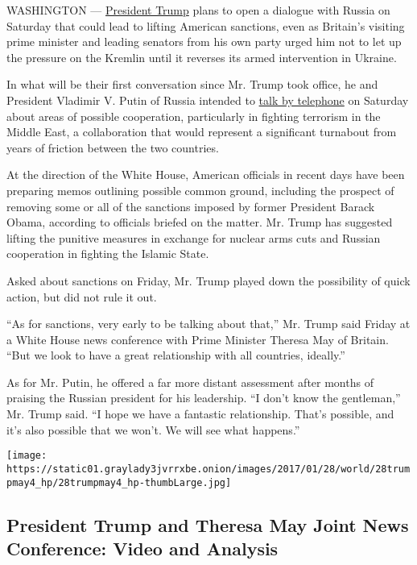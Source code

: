 WASHINGTON ---
\href{https://www.nytimes3xbfgragh.onion/topic/person/donald-trump}{President
Trump} plans to open a dialogue with Russia on Saturday that could lead
to lifting American sanctions, even as Britain's visiting prime minister
and leading senators from his own party urged him not to let up the
pressure on the Kremlin until it reverses its armed intervention in
Ukraine.

In what will be their first conversation since Mr. Trump took office, he
and President Vladimir V. Putin of Russia intended to
\href{http://www.nytimes3xbfgragh.onion/aponline/2017/01/27/world/europe/ap-eu-russia-us.html}{talk
by telephone} on Saturday about areas of possible cooperation,
particularly in fighting terrorism in the Middle East, a collaboration
that would represent a significant turnabout from years of friction
between the two countries.

At the direction of the White House, American officials in recent days
have been preparing memos outlining possible common ground, including
the prospect of removing some or all of the sanctions imposed by former
President Barack Obama, according to officials briefed on the matter.
Mr. Trump has suggested lifting the punitive measures in exchange for
nuclear arms cuts and Russian cooperation in fighting the Islamic State.

Asked about sanctions on Friday, Mr. Trump played down the possibility
of quick action, but did not rule it out.

``As for sanctions, very early to be talking about that,'' Mr. Trump
said Friday at a White House news conference with Prime Minister Theresa
May of Britain. ``But we look to have a great relationship with all
countries, ideally.''

As for Mr. Putin, he offered a far more distant assessment after months
of praising the Russian president for his leadership. ``I don't know the
gentleman,'' Mr. Trump said. ``I hope we have a fantastic relationship.
That's possible, and it's also possible that we won't. We will see what
happens.''

\href{https://www.nytimes3xbfgragh.onion/interactive/2017/01/27/us/politics/donald-trump-theresa-may-live.html}{}

\texttt{[image: https://static01.graylady3jvrrxbe.onion/images/2017/01/28/world/28trumpmay4\_hp/28trumpmay4\_hp-thumbLarge.jpg]}

\hypertarget{president-trump-and-theresa-may-joint-news-conference-video-and-analysis}{%
\subsection{President Trump and Theresa May Joint News Conference: Video
and
Analysis}\label{president-trump-and-theresa-may-joint-news-conference-video-and-analysis}}

